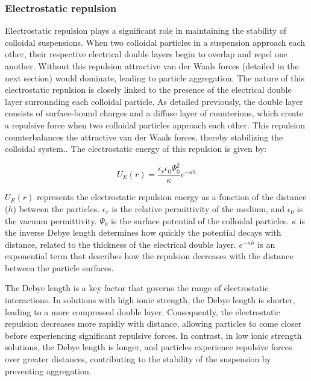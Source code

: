 
\subsubsection{Electrostatic repulsion}


Electrostatic repulsion plays a significant role in maintaining the stability of colloidal suspensions. When two colloidal particles in a suspension approach each other, their respective electrical double layers begin to overlap and repel one another. Without this repulsion attractive van der Waals forces (detailed in the next section) would dominate, leading to particle aggregation. The nature of this electrostatic repulsion is closely linked to the presence of the electrical double layer surrounding each colloidal particle. As detailed previously, the double layer consists of surface-bound charges and a diffuse layer of counterions, which create a repulsive force when two colloidal particles approach each other. This repulsion counterbalances the attractive van der Waals forces, thereby  stabilizing the colloidal system..\cite{?} The electrostatic energy of this repulsion is given by:


\begin{equation} %
U_E(r) = \frac{\epsilon_r \epsilon_0 \Psi_0^2}{\kappa} e^{-\kappa h}
\end{equation}

\( U_E(r) \) represents the electrostatic repulsion energy as a function of the distance (\( h \)) between the particles. \( \epsilon_r \) is the relative permittivity of the medium, and \( \epsilon_0 \) is the vacuum permittivity. \( \Psi_0 \) is the surface potential of the colloidal particles. \( \kappa \) is the inverse Debye length   determines how quickly the potential decays with distance, related to the thickness of the electrical double layer. \( e^{-\kappa h} \) is an exponential term that describes how the repulsion decreases with the distance between the particle surfaces. \cite{OHSHIMA200218} \cite{behrens2001charge}

The Debye length is a key factor that governs the range of electrostatic interactions. In solutions with high ionic strength, the Debye length is shorter, leading to a more compressed double layer. Consequently, the electrostatic repulsion decreases more rapidly with distance, allowing particles to come closer before experiencing significant repulsive forces. In contrast, in low ionic strength solutions, the Debye length is longer, and particles experience repulsive forces over greater distances, contributing to the stability of the suspension by preventing aggregation.

